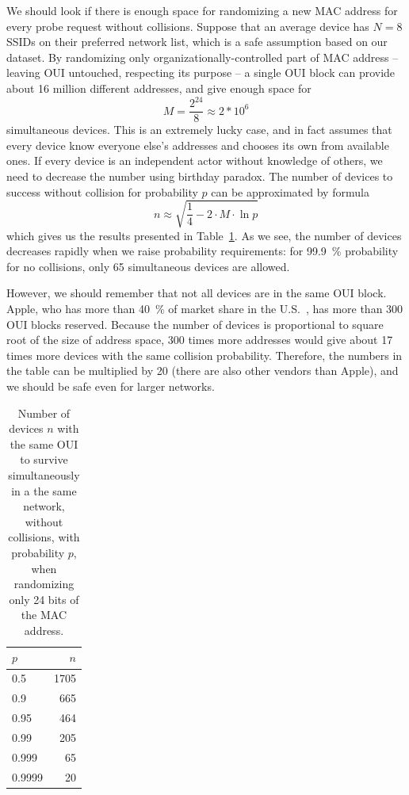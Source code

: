 \documentclass[12pt,a4paper,oneside,pdftex]{report}
\begin{document}
We should look if there is enough space for randomizing a new MAC address for every probe request without collisions. Suppose that an average device has $N = 8$ SSIDs on their preferred network list, which is a safe assumption based on our dataset. By randomizing only organizationally-controlled part of MAC address -- leaving OUI untouched, respecting its purpose -- a single OUI block can provide about 16 million different addresses, and give enough space for
$$M = \frac{2^{24}}{8} \approx 2*10^6$$
simultaneous devices. This is an extremely lucky case, and in fact assumes that every device know everyone else's addresses and chooses its own from available ones. If every device is an independent actor without knowledge of others, we need to decrease the number using birthday paradox. The number of devices to success without collision for probability $p$ can be approximated by formula~\cite{mathis1991generalized} 
$$n \approx \sqrt{\frac{1}{4} - 2 \cdot M \cdot \ln p}$$ 
which gives us the results presented in Table~\ref{tab:prob_random}. As we see, the number of devices decreases rapidly when we raise probability requirements: for 99.9~\% probability for no collisions, only 65 simultaneous devices are allowed.

However, we should remember that not all devices are in the same OUI block. Apple, who has more than 40~\% of market share in the U.S.~\cite{comscore2014}, has more than 300 OUI blocks reserved. Because the number of devices is proportional to square root of the size of address space, 300 times more addresses would give about 17 times more devices with the same collision probability. Therefore, the numbers in the table can be multiplied by 20 (there are also other vendors than Apple), and we should be safe even for larger networks.


\begin{table}[ht]
\center
\begin{tabular}{|l|r|}
    \hline
    $p$ & $n$   \\ \hline
    0.5 & 1705  \\ \hline
    0.9 & 665   \\ \hline
    0.95 & 464  \\ \hline
    0.99 & 205  \\ \hline
    0.999 & 65  \\ \hline
    0.9999 & 20 \\ \hline
\end{tabular}
\caption{Number of devices $n$ with the same OUI to survive simultaneously in a the same network, without collisions, with probability $p$, when randomizing only 24 bits of the MAC address.}
\label{tab:prob_random}
\end{table}
\end{document}
